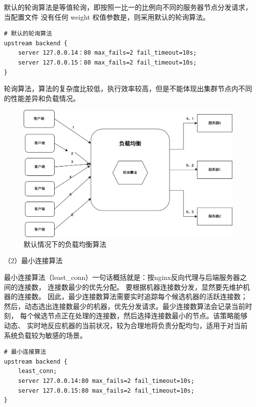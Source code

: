 默认的轮询算法是等值轮询，即按照一比一的比例向不同的服务器节点分发请求，当配置文件
没有任何 weight 权值参数是，则采用默认的轮询算法。

\begin{lstlisting}
# 默认的轮询算法
upstream backend {
    server 127.0.0.14：80 max_fails=2 fail_timeout=10s;
    server 127.0.0.15：80 max_fails=2 fail_timeout=10s;
}
\end{lstlisting}

轮询算法，算法的复杂度比较低，执行效率较高，但是不能体现出集群节点内不同的性能差异和负载情况。

\begin{figure}[htbp]
	\centering
	\includegraphics[width=\textwidth]{figures/round-robin.png}
	\caption{默认情况下的负载均衡算法}
	\label{default_bound_balance}
\end{figure}

（2）最小连接算法

最小连接算法（least\_conn）一句话概括就是：按nginx反向代理与后端服务器之间的连接数，
连接数最少的优先分配\cite{周常志2023基于改进加权最小连接数的微服务负载均衡算法研究}。
要根据机器连接数分发，显然要先维护机器的连接数。
因此，最少连接数算法需要实时追踪每个候选机器的活跃连接数；
然后，动态选出连接数最少的机器，优先分发请求。最少连接数算法会记录当前时刻，
每个候选节点正在处理的连接数，然后选择连接数最小的节点。该策略能够动态、
实时地反应机器的当前状况，较为合理地将负责分配均匀，适用于对当前系统负载较为敏感的场景。

\begin{lstlisting}
# 最小连接算法
upstream backend {
    least_conn;
    server 127.0.0.14:80 max_fails=2 fail_timeout=10s;
    server 127.0.0.15:80 max_fails=2 fail_timeout=10s;
}
\end{lstlisting}

